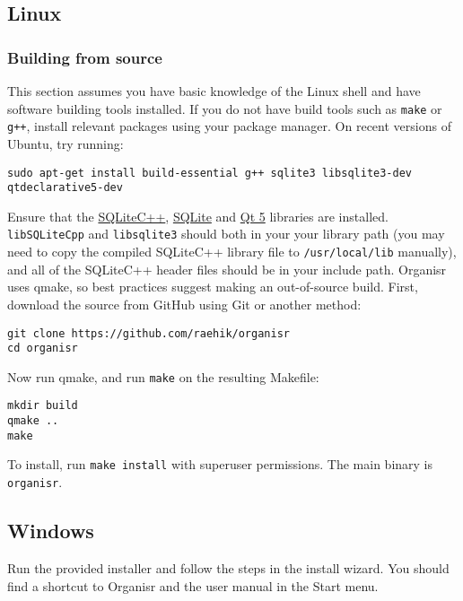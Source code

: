 \subsection{Linux}

\subsubsection{Building from source}

This section assumes you have basic knowledge of the Linux shell and have
software building tools installed. If you do not have build tools such as
\texttt{make} or \texttt{g++}, install relevant packages using your package
manager. On recent versions of Ubuntu, try running:

\begin{lstlisting}
sudo apt-get install build-essential g++ sqlite3 libsqlite3-dev qtdeclarative5-dev
\end{lstlisting}

Ensure that the \href{http://srombauts.github.io/SQLiteCpp/}{SQLiteC++},
\href{http://sqlite.org/download.html}{SQLite} and
\href{http://www.qt.io/developers/}{Qt 5} libraries are installed.
\verb|libSQLiteCpp| and \verb|libsqlite3| should both in your your library path
(you may need to copy the compiled SQLiteC++ library file to
\verb|/usr/local/lib| manually), and all of the SQLiteC++ header files should be
in your include path. Organisr uses qmake, so best practices suggest making an
out-of-source build. First, download the source from GitHub using Git or another
method:

\begin{lstlisting}
git clone https://github.com/raehik/organisr
cd organisr
\end{lstlisting}

Now run qmake, and run \verb|make| on the resulting Makefile:

\begin{lstlisting}
mkdir build
qmake ..
make
\end{lstlisting}

To install, run \verb|make install| with superuser permissions. The main binary
is \verb|organisr|.


\subsection{Windows}

Run the provided installer and follow the steps in the install wizard. You
should find a shortcut to Organisr and the user manual in the Start menu.
